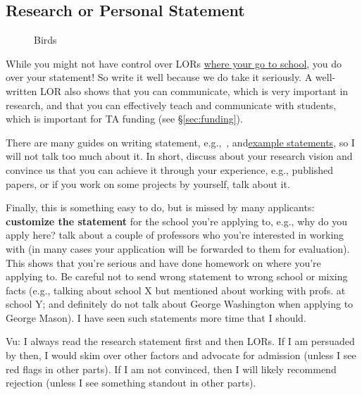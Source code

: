 \documentclass[11pt]{article}
\newenvironment{commentbox}{
 \small
    \begin{cbox}
 }{
   \end{cbox}
}
\begin{document}
\subsection{Research or Personal Statement}\label{sec:research-statement}

\begin{wrapfigure}{r}{0.5\textwidth}
  \begin{center}
  \end{center}
  \caption{Birds}
\end{wrapfigure}
While you might not have control over LORs \hyperref[sec:your-school]{where your go to school}, you do over your
statement! So write it well because we do take it seriously.
A well-written LOR also shows that you can communicate, which is very important in research, and that you can effectively teach and communicate with students, which is important for TA funding (see \S\ref{sec:funding}).

There are many guides on writing statement, e.g.,~\cite{blattman2022writing}, and\href{https://cs-sop.org/}{example statements},  so I will not talk too much about it. In short, discuss about your research vision and convince us that you can achieve it through your experience, e.g., published papers, or if you work on some projects by yourself, talk about it.

Finally, this is something easy to do, but is missed by many
applicants: \textbf{customize the statement} for the school you're applying to,
e.g., why do you apply here? talk about a couple of professors who you're interested in working with (in many cases your application will be forwarded to them for evaluation).
This shows that you're serious and have done homework on where you're applying to.
Be careful not to send wrong statement to wrong school or mixing
facts (e.g., talking about school X but mentioned about working with
profs. at school Y; and definitely do not talk about George Washington when applying to George Mason). I have seen such statements more time that I
should.


\begin{commentbox}
\small
Vu: I always read the research statement first and then LORs. If I am
persuaded by then, I would skim over other factors and advocate for
admission (unless I see red flags in other parts). If I am not
convinced, then I will likely recommend rejection (unless I see
something standout in other parts).
\end{commentbox}
\end{document}
